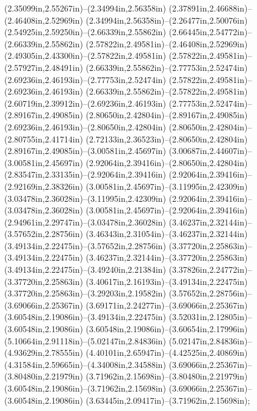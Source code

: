 (2.35099in,2.55267in)--(2.34994in,2.56358in) (2.37891in,2.46688in)--(2.46408in,2.52969in) (2.34994in,2.56358in)--(2.26477in,2.50076in) (2.54925in,2.59250in)--(2.66339in,2.55862in) (2.66445in,2.54772in)--(2.66339in,2.55862in) (2.57822in,2.49581in)--(2.46408in,2.52969in) (2.49305in,2.43300in)--(2.57822in,2.49581in) (2.57822in,2.49581in)--(2.57927in,2.48491in) (2.66339in,2.55862in)--(2.77753in,2.52474in) (2.69236in,2.46193in)--(2.77753in,2.52474in) (2.57822in,2.49581in)--(2.69236in,2.46193in) (2.66339in,2.55862in)--(2.57822in,2.49581in) (2.60719in,2.39912in)--(2.69236in,2.46193in) (2.77753in,2.52474in)--(2.89167in,2.49085in) (2.80650in,2.42804in)--(2.89167in,2.49085in) (2.69236in,2.46193in)--(2.80650in,2.42804in) (2.80650in,2.42804in)--(2.80755in,2.41714in) (2.72133in,2.36523in)--(2.80650in,2.42804in) (2.89167in,2.49085in)--(3.00581in,2.45697in) (3.00687in,2.44607in)--(3.00581in,2.45697in) (2.92064in,2.39416in)--(2.80650in,2.42804in) (2.83547in,2.33135in)--(2.92064in,2.39416in) (2.92064in,2.39416in)--(2.92169in,2.38326in) (3.00581in,2.45697in)--(3.11995in,2.42309in) (3.03478in,2.36028in)--(3.11995in,2.42309in) (2.92064in,2.39416in)--(3.03478in,2.36028in) (3.00581in,2.45697in)--(2.92064in,2.39416in) (2.94961in,2.29747in)--(3.03478in,2.36028in) (3.46237in,2.32144in)--(3.57652in,2.28756in) (3.46343in,2.31054in)--(3.46237in,2.32144in) (3.49134in,2.22475in)--(3.57652in,2.28756in) (3.37720in,2.25863in)--(3.49134in,2.22475in) (3.46237in,2.32144in)--(3.37720in,2.25863in) (3.49134in,2.22475in)--(3.49240in,2.21384in) (3.37826in,2.24772in)--(3.37720in,2.25863in) (3.40617in,2.16193in)--(3.49134in,2.22475in) (3.37720in,2.25863in)--(3.29203in,2.19582in) (3.57652in,2.28756in)--(3.69066in,2.25367in) (3.69171in,2.24277in)--(3.69066in,2.25367in) (3.60548in,2.19086in)--(3.49134in,2.22475in) (3.52031in,2.12805in)--(3.60548in,2.19086in) (3.60548in,2.19086in)--(3.60654in,2.17996in) (5.10664in,2.91118in)--(5.02147in,2.84836in) (5.02147in,2.84836in)--(4.93629in,2.78555in) (4.40101in,2.65947in)--(4.42525in,2.40869in) (4.31584in,2.59665in)--(4.34008in,2.34588in) (3.69066in,2.25367in)--(3.80480in,2.21979in) (3.71962in,2.15698in)--(3.80480in,2.21979in) (3.60548in,2.19086in)--(3.71962in,2.15698in) (3.69066in,2.25367in)--(3.60548in,2.19086in) (3.63445in,2.09417in)--(3.71962in,2.15698in);
